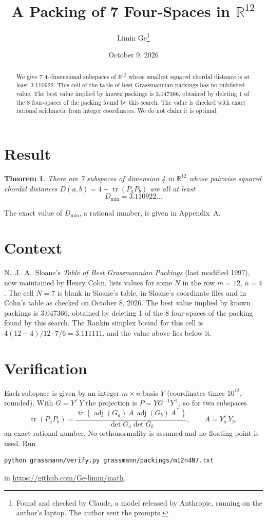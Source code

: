 \documentclass[11pt,a4paper]{article}
\title{A Packing of 7 Four-Spaces in $\mathbb{R}^{12}$}
\author{Limin Ge\thanks{Found and checked by Claude, a model released by Anthropic, running on the author's laptop. The author sent the prompts.}}
\date{October 9, 2026}
\newtheorem*{theorem}{Theorem}
\begin{document}
\maketitle
\begin{abstract}
We give 7 4-dimensional subspaces of $\mathbb{R}^{12}$ whose smallest squared chordal distance is at least 3.110922. This cell of the table of best Grassmannian packings has no published value. The best value implied by known packings is 3.047366, obtained by deleting 1 of the 8 four-spaces of the packing found by this search. The value is checked with exact rational arithmetic from integer coordinates. We do not claim it is optimal.
\end{abstract}

\section{Result}
\begin{theorem}
There are 7 subspaces of dimension 4 in $\mathbb{R}^{12}$ whose pairwise squared chordal distances $D(a,b) = 4 - \operatorname{tr}(P_aP_b)$ are all at least
\[ D_{\min} = 3.110922\ldots \]
\end{theorem}
The exact value of $D_{\min}$, a rational number, is given in Appendix~A.


\section{Context}
N.~J.~A.~Sloane's \emph{Table of Best Grassmannian Packings} (last modified 1997), now maintained by Henry Cohn, lists values for some $N$ in the row $m=12$, $n=4$. The cell $N=7$ is blank in Sloane's table, in Sloane's coordinate files and in Cohn's table as checked on October 8, 2026. The best value implied by known packings is 3.047366, obtained by deleting 1 of the 8 four-spaces of the packing found by this search. The Rankin simplex bound for this cell is $4(12-4)/12\cdot 7/6 = 3.111111$, and the value above lies below it.


\section{Verification}
Each subspace is given by an integer $m\times n$ basis $Y$ (coordinates times $10^{12}$, rounded). With $G=Y^\top Y$ the projection is $P=YG^{-1}Y^\top$, so for two subspaces
\[ \operatorname{tr}(P_aP_b)=\frac{\operatorname{tr}(\operatorname{adj}(G_a)\,A\,\operatorname{adj}(G_b)\,A^\top)}{\det G_a\det G_b},\qquad A=Y_a^\top Y_b, \]
an exact rational number. No orthonormality is assumed and no floating point is used. Run
\begin{verbatim}
python grassmann/verify.py grassmann/packings/m12n4N7.txt
\end{verbatim}
in \url{https://github.com/Ge-limin/math}.
\end{document}
